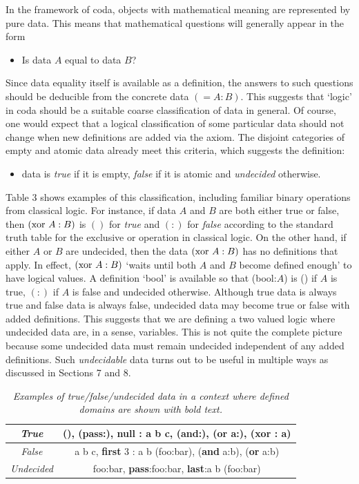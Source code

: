 \documentclass[11pt]{article}
\begin{document}
    In the framework of coda, objects with mathematical meaning are represented by pure data.  This means that mathematical
questions will generally appear in the form
\begin{itemize}
\item Is data $A$ equal to data $B$?
\end{itemize}
Since data equality itself is available as a definition, the answers to such questions should be 
deducible from the concrete data $(=A:B)$.
This suggests that `logic' in coda should be a suitable coarse classification of data in general.  Of course, one would 
expect that a logical classification of some particular data should not change when new definitions are added via the axiom. 
The disjoint categories of empty and atomic data already meet this criteria, which suggests the definition:  
\begin{itemize}
\item data is {\it true} if it is empty, {\it false} if it is atomic and {\it undecided} otherwise.
\end{itemize}
Table 3 shows examples of this classification, including familiar binary operations from classical logic.
For instance, if data $A$ and $B$ are both either true or false, then $({\rm xor}\ A:B)$ is $()$ for {\it true} and $(:)$ for {\it false} according to the standard truth
 table for the exclusive or operation in classical logic.  On the other hand, if either $A$ or $B$ are
undecided, then the data $({\rm xor}\ A:B)$ has no definitions that apply.  In effect, $({\rm xor}\ A:B)$ `waits until both $A$ and $B$ become defined
enough' to have logical values.  A definition `bool' is available so that (bool:$A$) is () if $A$ is true, $(:)$ if $A$ is false and 
undecided otherwise. 
Although true data is always true and false data is always false, undecided data may become true or false with added definitions.
This suggests that we are defining a two valued logic where undecided data are, in a sense, variables.  This is 
not quite the complete picture because some undecided data must remain undecided independent of any added definitions.
Such {\it undecidable} data turns out to be useful in multiple ways as discussed in Sections 7 and 8. 
\begin{table}
\begin{center}
\begin{tabular}{ | c | c | }
\hline
 {\it True} & (), ({\bf pass}:), {\bf null} : a b c, ({\bf and}:), ({\bf or} a:), ({\bf xor} : a)  \\
 \hline
 {\it False} & a b c, {\bf first} 3 : a b (foo:bar), ({\bf and} a:b), ({\bf or} a:b)  \\
 \hline
 {\it Undecided} & foo:bar, {\bf pass}:foo:bar, {\bf last}:a b (foo:bar)  \\
 \hline
\end{tabular}
\end{center}
\caption{\label{ }{\it Examples of true/false/undecided data in a context where defined domains are shown with bold text.}}
\end{table}
\end{document}

